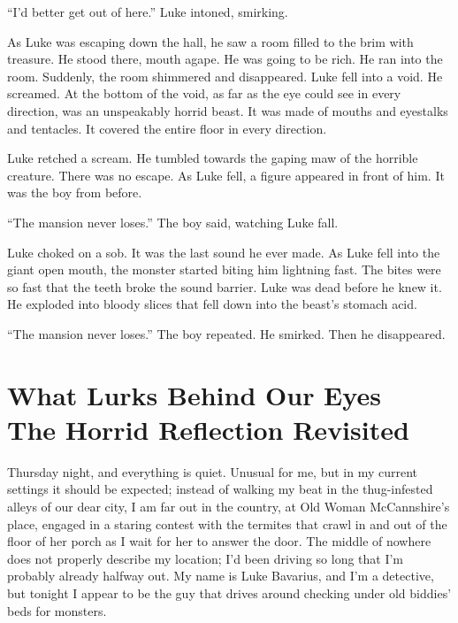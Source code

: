 ``I'd better get out of here.'' Luke intoned,
smirking.



As Luke was escaping down the hall, he saw a room filled to the
brim with treasure. He stood there, mouth agape. He was going to be
rich. He ran into the room. Suddenly, the room shimmered and
disappeared. Luke fell into a void. He screamed. At the bottom of
the void, as far as the eye could see in every direction, was an
unspeakably horrid beast. It was made of mouths and eyestalks and
tentacles. It covered the entire floor in every direction.



Luke retched a scream. He tumbled towards the gaping maw of the
horrible creature. There was no escape. As Luke fell, a figure
appeared in front of him. It was the boy from before.



``The mansion never loses.'' The boy said, watching Luke
fall.



Luke choked on a sob. It was the last sound he ever made. As Luke
fell into the giant open mouth, the monster started biting him
lightning fast. The bites were so fast that the teeth broke the
sound barrier. Luke was dead before he knew it. He exploded into
bloody slices that fell down into the beast's stomach
acid.



``The mansion never loses.'' The boy repeated. He
smirked. Then he disappeared.


 



\chapter[What Lurks Behind Our Eyes]{What Lurks Behind Our Eyes\\The Horrid Reflection Revisited}





Thursday night, and everything is quiet. Unusual for me, but in my
current settings it should be expected; instead of walking my beat
in the thug-infested alleys of our dear city, I am far out in the
country, at Old Woman McCannshire's place, engaged in a staring
contest with the termites that crawl in and out of the floor of her
porch as I wait for her to answer the door. The middle of nowhere
does not properly describe my location; I'd been driving so long
that I'm probably already halfway out. My name is Luke Bavarius,
and I'm a detective, but tonight I appear to be the guy that drives
around checking under old biddies' beds for monsters.



